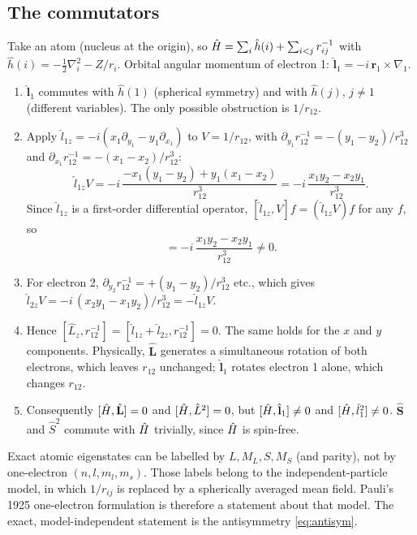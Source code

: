 \subsection{The commutators}
Take an atom (nucleus at the origin), so $\hat H=\sum_i\hat h(i)+\sum_{i<j}r_{ij}^{-1}$ with
$\hat h(i)=-\tfrac12\nabla_i^2-Z/r_i$. Orbital angular momentum of electron 1:
$\hat{\mathbf l}_1=-i\,\mathbf r_1\times\nabla_1$.
\begin{enumerate}
  \item $\hat{\mathbf l}_1$ commutes with $\hat h(1)$ (spherical symmetry) and with $\hat h(j)$, $j\ne1$ (different variables).
        The only possible obstruction is $1/r_{12}$.
  \item Apply $\hat l_{1z}=-i(x_1\partial_{y_1}-y_1\partial_{x_1})$ to $V=1/r_{12}$, with
        $\partial_{y_1}r_{12}^{-1}=-(y_1-y_2)/r_{12}^3$ and $\partial_{x_1}r_{12}^{-1}=-(x_1-x_2)/r_{12}^3$:
        \[
          \hat l_{1z}V=-i\,\frac{-x_1(y_1-y_2)+y_1(x_1-x_2)}{r_{12}^3}=-i\,\frac{x_1y_2-x_2y_1}{r_{12}^3}.
        \]
        Since $\hat l_{1z}$ is a first-order differential operator, $[\hat l_{1z},V]f=(\hat l_{1z}V)f$ for any $f$, so
        \begin{equation}
          [\hat l_{1z},\,r_{12}^{-1}]=-i\,\frac{x_1y_2-x_2y_1}{r_{12}^3}\neq0 .
        \end{equation}
  \item For electron 2, $\partial_{y_2}r_{12}^{-1}=+(y_1-y_2)/r_{12}^3$ etc., which gives
        $\hat l_{2z}V=-i\,(x_2y_1-x_1y_2)/r_{12}^3=-\hat l_{1z}V$.
  \item Hence $[\hat L_z,r_{12}^{-1}]=[\hat l_{1z}+\hat l_{2z},r_{12}^{-1}]=0$. The same holds for the $x$ and $y$
        components. Physically, $\hat{\mathbf L}$ generates a simultaneous rotation of both electrons, which
        leaves $r_{12}$ unchanged; $\hat{\mathbf l}_1$ rotates electron 1 alone, which changes $r_{12}$.
  \item Consequently $[\hat H,\hat{\mathbf L}]=0$ and $[\hat H,\hat L^2]=0$, but $[\hat H,\hat{\mathbf l}_1]\neq0$ and $[\hat H,\hat l_1^2]\neq0$.
        $\hat{\mathbf S}$ and $\hat S^2$ commute with $\hat H$ trivially, since $\hat H$ is spin-free.
\end{enumerate}
\begin{resultbox}
Exact atomic eigenstates can be labelled by $L,M_L,S,M_S$ (and parity), not by one-electron $(n,l,m_l,m_s)$.
Those labels belong to the independent-particle model, in which $1/r_{ij}$ is replaced by a spherically
averaged mean field. Pauli's 1925 one-electron formulation is therefore a statement about that model. The
exact, model-independent statement is the antisymmetry \cref{eq:antisym}.
\end{resultbox}
